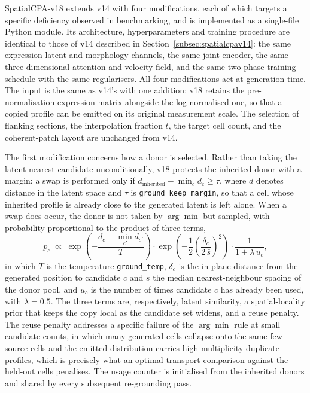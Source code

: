 SpatialCPA-v18 extends v14 with four modifications, each of which targets a specific deficiency
observed in benchmarking, and is implemented as a single-file Python module. Its architecture,
hyperparameters and training procedure are identical to those of v14 described in
Section~\ref{subsec:spatialcpav14}: the same expression latent and morphology channels, the same joint
encoder, the same three-dimensional attention and velocity field, and the same two-phase training
schedule with the same regularisers. All four modifications act at generation time. The input is the
same as v14's with one addition: v18 retains the pre-normalisation expression matrix alongside the
log-normalised one, so that a copied profile can be emitted on its original measurement scale. The
selection of flanking sections, the interpolation fraction $t$, the target cell count, and the
coherent-patch layout are unchanged from v14.

The first modification concerns how a donor is selected. Rather than taking the latent-nearest
candidate unconditionally, v18 protects the inherited donor with a margin: a swap is performed only if
$d_{\textrm{inherited}} - \min_{c} d_{c} \geq \tau$, where $d$ denotes distance in the latent space and
$\tau$ is \texttt{ground\_keep\_margin}, so that a cell whose inherited profile is already close to the
generated latent is left alone. When a swap does occur, the donor is not taken by $\arg\min$ but
sampled, with probability proportional to the product of three terms,
\[
p_{c} \;\propto\; \exp\!\left(-\frac{d_{c} - \min_{c'} d_{c'}}{T}\right)
\cdot \exp\!\left(-\frac{1}{2}\left(\frac{\delta_{c}}{2 \, \bar{s}}\right)^{2}\right)
\cdot \frac{1}{1 + \lambda \, u_{c}},
\]
in which $T$ is the temperature \texttt{ground\_temp}, $\delta_{c}$ is the in-plane distance from the
generated position to candidate $c$ and $\bar{s}$ the median nearest-neighbour spacing of the donor
pool, and $u_{c}$ is the number of times candidate $c$ has already been used, with $\lambda = 0.5$.
The three terms are, respectively, latent similarity, a spatial-locality prior that keeps the copy
local as the candidate set widens, and a reuse penalty. The reuse penalty addresses a specific
failure of the $\arg\min$ rule at small candidate counts, in which many generated cells collapse onto
the same few source cells and the emitted distribution carries high-multiplicity duplicate profiles,
which is precisely what an optimal-transport comparison against the held-out cells penalises. The
usage counter is initialised from the inherited donors and shared by every subsequent re-grounding
pass.

